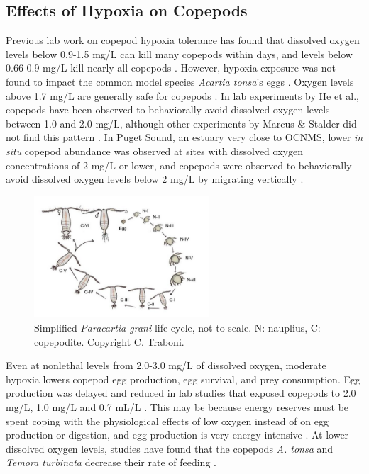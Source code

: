 \documentclass[12pt,twoside]{reedthesis}
\begin{document}
\subsection{Effects of Hypoxia on Copepods}

Previous lab work on copepod hypoxia tolerance has found that dissolved oxygen levels below 0.9-1.5 mg/L can kill many copepods within days, and levels below 0.66-0.9 mg/L kill nearly all copepods \autocite{He2021, Marcus2004, Stalder1997, Grodzins2016}. However, hypoxia exposure was not found to impact the common model species \textit{Acartia tonsa}'s eggs \autocite{Invidia2004}. Oxygen levels above 1.7 mg/L are generally safe for copepods \autocite{Grodzins2016}. In lab experiments by He et al., copepods have been observed to behaviorally avoid dissolved oxygen levels between 1.0 and 2.0 mg/L, although other experiments by Marcus \& Stalder did not find this pattern \autocite{He2021, Stalder1997}. In Puget Sound, an estuary very close to OCNMS, lower \textit{in situ} copepod abundance was observed at sites with dissolved oxygen concentrations of 2 mg/L or lower, and copepods were observed to behaviorally avoid dissolved oxygen levels below 2 mg/L by migrating vertically \autocite{Keister2020, Keister2013}. 

\begin{figure}
	\begin{center}
		\includegraphics[width=0.58\textwidth]{Fig_Life_cycle}
		\caption[Life cycle of copepods]{\footnotesize{Simplified \textit{Paracartia grani} life cycle, not to scale. N: nauplius, C: copepodite. Copyright C. Traboni. }} %
		\label{LifeCycle}
	\end{center}
\end{figure} 

Even at nonlethal levels from 2.0-3.0 mg/L of dissolved oxygen, moderate hypoxia lowers copepod egg production, egg survival, and prey consumption. Egg production was delayed and reduced in lab studies that exposed copepods to 2.0 mg/L, 1.0 mg/L and 0.7 mL/L \autocite{Marcus2004, Richmond2006, Roman1993}. This may be because energy reserves must be spent coping with the physiological effects of low oxygen instead of on egg production or digestion, and egg production is very energy-intensive \autocite{Marcus2004, Elliott2013, Lutz1992, Stalder1997, Roff1992}. At lower dissolved oxygen levels, studies have found that the copepods \textit{A. tonsa} and \textit{Temora turbinata} decrease their rate of feeding \autocite{He2021, Elliott2013}. 
\end{document}
